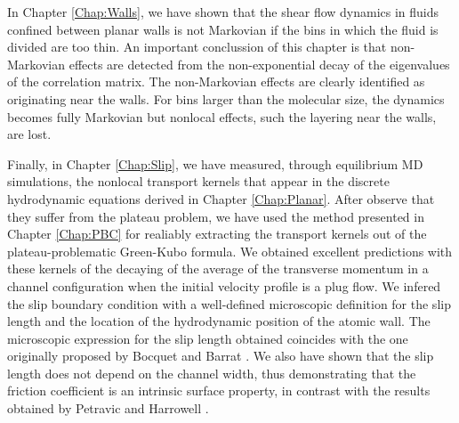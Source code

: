 \documentclass[b5paper,openright,10pt]{book}
\begin{document}
In Chapter \ref{Chap:Walls}, we  have shown that the
shear flow  dynamics in  fluids confined between  planar walls  is not
Markovian if  the bins  in which  the fluid is  divided are  too thin. 
An important conclussion of this chapter is that non-Markovian effects  are detected from the  non-exponential decay of
the eigenvalues of the  correlation matrix.  The non-Markovian effects
are clearly identified as originating  near the walls. For bins larger
than the molecular size, the dynamics becomes fully Markovian but nonlocal effects, such the layering near the walls, are lost. 

Finally, in Chapter \ref{Chap:Slip}, we have measured, through equilibrium MD simulations,
the nonlocal
transport  kernels that appear in the discrete hydrodynamic equations derived in Chapter \ref{Chap:Planar}.
After observe that they suffer from the plateau problem, we have used the method presented in Chapter \ref{Chap:PBC}
for realiably extracting the transport kernels out of the plateau-problematic Green-Kubo formula. 
We obtained excellent predictions with these kernels of the decaying of the average of the transverse momentum in a channel configuration when the initial velocity profile is a plug flow. 
We infered the  slip  boundary
condition with  a well-defined  microscopic definition for  the slip
length and the  location of the hydrodynamic position  of the atomic
wall.   The  microscopic expression  for  the  slip length  obtained
coincides  with the  one originally  proposed by  Bocquet and  Barrat \cite{Bocquet1994}
.  We also  have shown that the slip
length does not depend on  the channel width, thus demonstrating that
the friction coefficient is an intrinsic surface property, in contrast with the results obtained by Petravic and Harrowell \cite{Petravic2007}.

\end{document}
